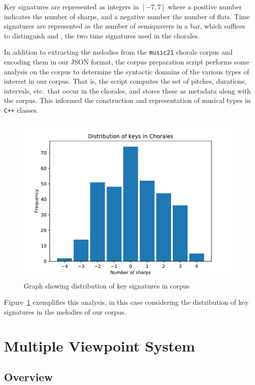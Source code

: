 \documentclass[12pt,a4paper,twoside,openright]{report}
\begin{document}
Key signatures are represented as integers in $[-7,7]$ where a positive number
indicates the number of sharps, and a negative number the number of flats.
Time signatures are represented as the number of semiquavers in a bar, which
suffices to distinguish  and ,
the two time signatures used in the chorales.

In addition to extracting the melodies from the \texttt{music21} chorale corpus
and encoding them in our JSON format, the corpus preparation script performs
some analysis on the corpus to determine the syntactic domains of the various
types of interest in our corpus. That is, the script computes the set of
pitches, durations, intervals, etc.\ that occur in the chorales, and stores
these as metadata along with the corpus. This informed the construction and
representation of musical types in \texttt{C++} classes.

\begin{figure}[H]
\centering
\includegraphics[width=350pt]{figs/key_dist.pdf}
\caption{Graph showing distribution of key signatures in corpus}
\label{fig:key-dist}
\end{figure}

Figure~\ref{fig:key-dist} exemplifies this analysis, in this case considering the
distribution of key signatures in the melodies of our corpus. 

\section{Multiple Viewpoint System}

\subsection{Overview}
\end{document}
